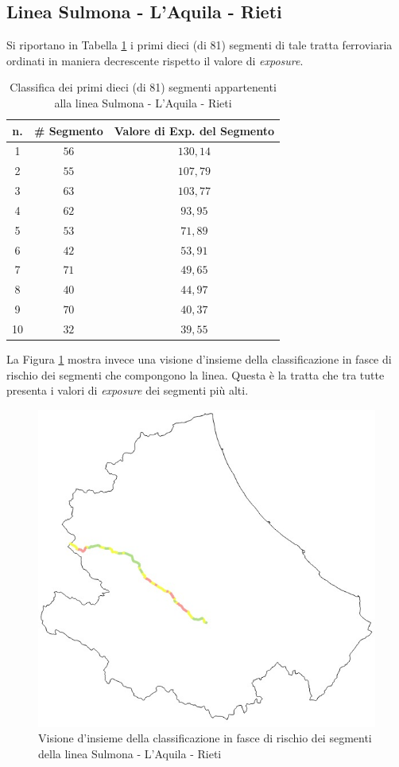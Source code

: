 \subsection{Linea Sulmona - L'Aquila - Rieti}
Si riportano in Tabella \ref{classificasulmonarieti} i primi dieci (di 81) segmenti di tale tratta ferroviaria ordinati in maniera decrescente rispetto il valore di \textit{exposure}.
\begin{table}[h]
\centering
\begin{tabular}{|c|c|c|}
\hline
\rowcolor{lightgray}
n. & \# Segmento & Valore di Exp. del Segmento \\ \hline \rowcolor{flamingopink}
1  & $56$        & $130,14$                      \\ \hline \rowcolor{flamingopink}
2  & $55$        & $107,79$                      \\ \hline \rowcolor{flamingopink}
3  & $63$        & $103,77$                      \\ \hline \rowcolor{flamingopink}
4  & $62$        & $93,95$                      \\ \hline \rowcolor{flamingopink}
5  & $53$        & $71,89$                      \\ \hline \rowcolor{flamingopink}
6  & $42$        & $53,91$                      \\ \hline \rowcolor{flamingopink}
7  & $71$       & $49,65$                      \\ \hline \rowcolor{flamingopink}
8  & $40$        & $44,97$                      \\ \hline \rowcolor{flamingopink}
9  & $70$        & $40,37$                      \\ \hline \rowcolor{flamingopink}
10 & $32$        & $39,55$                      \\ \hline
\end{tabular}
\caption{Classifica dei primi dieci (di 81) segmenti appartenenti alla linea Sulmona - L'Aquila - Rieti}
\label{classificasulmonarieti}
\end{table}
\newline
La Figura \ref{sulmonarieti} mostra invece una visione d'insieme della classificazione in fasce di rischio dei segmenti che compongono la linea. Questa è la tratta che tra tutte presenta i valori di \textit{exposure} dei segmenti più alti. 
\begin{figure}[h]
\centering
\includegraphics[width=0.4\linewidth]{img/rietisulmona.jpeg}
\caption{Visione d'insieme della classificazione in fasce di rischio dei segmenti della linea Sulmona - L'Aquila - Rieti}
\label{sulmonarieti}
\end{figure}
